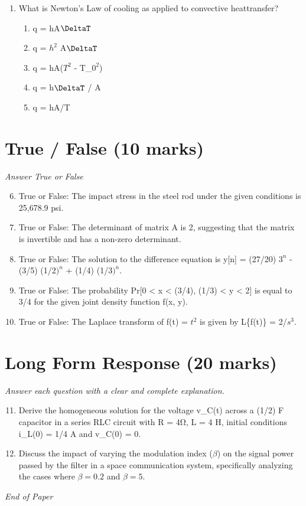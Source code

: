 \documentclass[12pt]{article}
\begin{document}
\begin{enumerate}[label=\arabic*.]
\begin{enumerate}[label=(\alph*)]
    \item 1
    \item 2
    \item 10
\end{enumerate}
\item What is Newton's Law of cooling as applied to convective heattransfer?
\begin{enumerate}[label=(\alph*)]
    \item q = hA\ensuremath{\DeltaT}
    \item q = $h^2$ A\ensuremath{\DeltaT}
    \item q = hA($T^2$ - T\_$0^2$)
    \item q = h\ensuremath{\DeltaT} / A
    \item q = hA/T
\end{enumerate}
\end{enumerate}

\section*{True / False (10 marks)}
\textit{Answer True or False}
\begin{enumerate}[label=\arabic*.]
\setcounter{enumi}{5}
\item True or False: The impact stress in the steel rod under the given conditions is 25,678.9 psi.
\item True or False: The determinant of matrix A is 2, suggesting that the matrix is invertible and has a non-zero determinant.
\item True or False: The solution to the difference equation is y[n] = (27/20) $3^n$ - (3/5) (1/$2)^n$ + (1/4) (1/$3)^n$.
\item True or False: The probability Pr[0 \textless{} x \textless{} (3/4), (1/3) \textless{} y \textless{} 2] is equal to 3/4 for the given joint density function f(x, y).
\item True or False: The Laplace transform of f(t) = $t^2$ is given by L\{f(t)\} = 2/$s^3$.
\end{enumerate}

\section*{Long Form Response (20 marks)}
\textit{Answer each question with a clear and complete explanation.}
\begin{enumerate}[label=\arabic*.]
\setcounter{enumi}{10}
\item Derive the homogeneous solution for the voltage v\_C(t) across a (1/2) F capacitor in a series RLC circuit with R = 4Ω, L = 4 H, initial conditions i\_L(0) = 1/4 A and v\_C(0) = 0.
\item Discuss the impact of varying the modulation index (\(\beta\)) on the signal power passed by the filter in a space communication system, specifically analyzing the cases where \(\beta = 0.2\) and \(\beta = 5\).
\end{enumerate}

\vfill
\noindent\textit{End of Paper}
\end{document}
